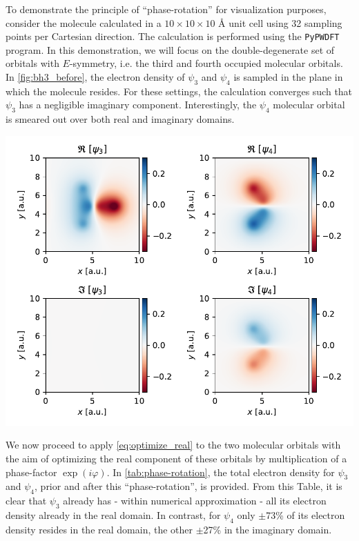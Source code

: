 To demonstrate the principle of ``phase-rotation'' for visualization purposes, consider the  molecule calculated in a $10 \times 10 \times 10$ \AA\; unit cell using 32 sampling points per Cartesian direction. The calculation is performed using the \texttt{PyPWDFT}\cite{pypwdft} program. In this demonstration, we will focus on the double-degenerate set of orbitals with $E$-symmetry, i.e. the third and fourth occupied molecular orbitals. In \cref{fig:bh3_before}, the electron density of $\psi_{3}$ and $\psi_{4}$ is sampled in the plane in which the  molecule resides. For these settings, the calculation converges such that $\psi_{3}$ has a negligible imaginary component. Interestingly, the $\psi_{4}$ molecular orbital is smeared out over both real and imaginary domains. 

\begin{Figure}
    \centering
    \includegraphics[width=\linewidth]{img/fig9.pdf}
    \label{fig:bh3_before}
\end{Figure}

We now proceed to apply \cref{eq:optimize_real} to the two molecular orbitals with the aim of optimizing the real component of these orbitals by multiplication of a phase-factor $\exp \left(i \varphi \right)$. In \cref{tab:phase-rotation}, the total electron density for $\psi_{3}$ and $\psi_{4}$, prior and after this ``phase-rotation'', is provided. From this Table, it is clear that $\psi_{3}$ already has - within numerical approximation - all its electron density already in the real domain. In contrast, for $\psi_{4}$ only $\pm$73\% of its electron density resides in the real domain, the other $\pm$27\% in the imaginary domain.

